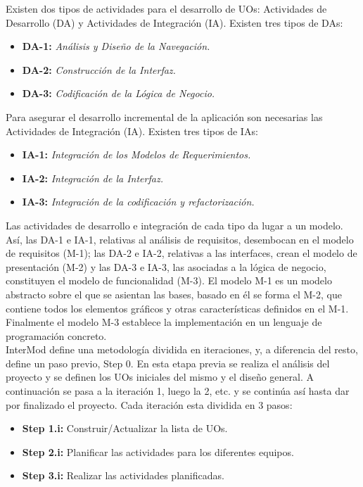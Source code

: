 Existen dos tipos de actividades para el desarrollo de UOs: Actividades de Desarrollo (DA) y Actividades de Integración (IA). Existen tres tipos de DAs:

\begin{itemize}
\item \textbf{DA-1:} \textit{Análisis y Diseño de la Navegación.}
\item \textbf{DA-2:} \textit{Construcción de la Interfaz.}
\item \textbf{DA-3:} \textit{Codificación de la Lógica de Negocio.}
\end{itemize}

Para asegurar el desarrollo incremental de la aplicación son necesarias las Actividades de Integración (IA). Existen tres tipos de IAs:
\begin{itemize}
\item \textbf{IA-1:} \textit{Integración de los Modelos de Requerimientos.}
\item \textbf{IA-2:} \textit{Integración de la Interfaz.}
\item \textbf{IA-3:} \textit{Integración de la codificación y refactorización.}
\end{itemize}

Las actividades de desarrollo e integración de cada tipo da lugar a un modelo. Así, las DA-1 e IA-1, relativas al análisis de requisitos, desembocan en el modelo de requisitos (M-1); las DA-2 e IA-2, relativas a las interfaces, crean el modelo de presentación (M-2) y las DA-3 e IA-3, las asociadas a la lógica de negocio, constituyen el modelo de funcionalidad (M-3). El modelo M-1 es un modelo abstracto sobre el que se asientan las bases, basado en él se forma el M-2, que contiene todos los elementos gráficos y otras características definidos en el M-1. Finalmente el modelo M-3 establece la implementación en un lenguaje de programación concreto.\\

InterMod define una metodología dividida en iteraciones, y, a diferencia del resto, define un paso previo, Step 0. En esta etapa previa se realiza el análisis del proyecto y se definen los UOs iniciales del mismo y el diseño general. A continuación se pasa a la iteración 1, luego la 2, etc. y se continúa así hasta dar por finalizado el proyecto. Cada iteración esta dividida en 3 pasos:

\begin{itemize}
\item \textbf{Step 1.i:} Construir/Actualizar la lista de UOs.
\item \textbf{Step 2.i:} Planificar las actividades para los diferentes equipos.
\item \textbf{Step 3.i:} Realizar las actividades planificadas.
\end{itemize}

